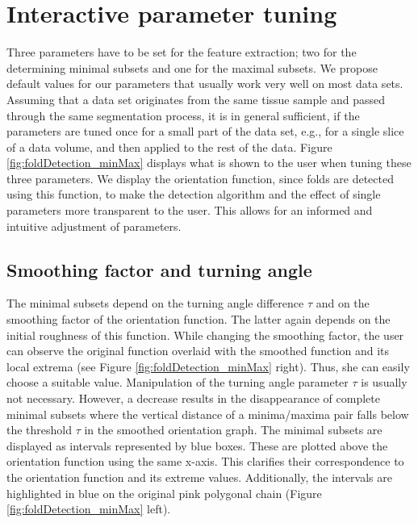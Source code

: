 \documentclass[twocolumn,a4paper]{article}
\begin{document}
\section{Interactive parameter tuning}
Three parameters have to be set for the feature extraction; two for the determining minimal subsets and one for the maximal subsets. 
We propose default values for our parameters that usually work very well on most data sets.
Assuming that a data set originates from the same tissue sample and passed through the same segmentation process, it is in general sufficient, if the parameters are tuned once for a small part of the data set, e.g., for a single slice of a data volume, 
and then applied to the rest of the data. 
Figure \ref{fig:foldDetection_minMax} displays what is shown to the user when tuning these three parameters.
We display the orientation function, since folds are detected using this function, to make the detection algorithm and the effect of single parameters more transparent to the user.
This allows for an informed and intuitive adjustment of parameters.

\subsection{Smoothing factor and turning angle}
The minimal subsets depend on the turning angle difference $\tau$ and on the smoothing factor of the orientation function.
The latter again depends on the initial roughness of this function. 
While changing the smoothing factor, the user can observe the original function overlaid with the smoothed function and its local extrema (see Figure \ref{fig:foldDetection_minMax} right). Thus, she can easily choose a suitable value.
Manipulation of the turning angle parameter $\tau$ is usually not necessary. 
However, a decrease results in the disappearance of complete minimal subsets where the vertical distance of a minima/maxima pair falls below the threshold $\tau$ in the smoothed orientation graph. 
The minimal subsets are displayed as intervals represented by blue boxes. These are plotted above the orientation function using the same x-axis. This clarifies their correspondence to the orientation function and its extreme values. 
Additionally, the intervals are highlighted in blue on the original pink polygonal chain (Figure \ref{fig:foldDetection_minMax} left).
\end{document}

